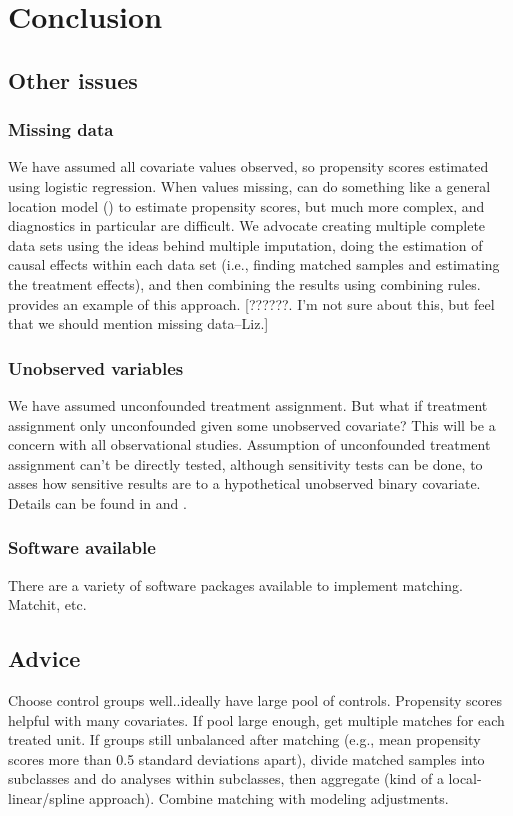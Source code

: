\documentclass[11pt,titlepage]{article}
\begin{document}
\section{Conclusion}
\subsection{Other issues}
\subsubsection{Missing data}
We have assumed all covariate values observed, so propensity scores estimated using logistic regression.  When values missing, can do something like a general
location model (\cite{DagRub00}) to estimate propensity scores, but much more complex, and diagnostics in particular are difficult.  We advocate creating 
multiple complete data sets using the ideas behind multiple imputation, doing the estimation of causal effects within each data set (i.e., finding matched samples
and estimating the treatment effects), and then combining the results using combining rules.  \cite{Song01} provides an example of this approach. 
[??????.  I'm not sure about this, but feel that we should mention
missing data--Liz.]  

\subsubsection{Unobserved variables}
We have assumed unconfounded treatment assignment.  But what if treatment assignment only unconfounded given some unobserved covariate?  This will be a concern with 
all observational studies.  Assumption of unconfounded treatment assignment can't be directly tested, although sensitivity tests can be done, to asses how sensitive
results are to a hypothetical unobserved binary covariate.  Details can be found in \cite{RosRub83b} and \cite{Imbens03}.  

\subsubsection{Software available}
There are a variety of software packages available to implement matching.  Matchit, etc.  

\subsection{Advice}
Choose control groups well..ideally have large pool of controls.  Propensity scores helpful with many covariates.  If pool large enough, get multiple matches for
each treated unit.  If groups still unbalanced after matching (e.g., mean propensity scores more than 0.5 standard deviations apart), divide matched samples into
subclasses and do analyses within subclasses, then aggregate (kind of a local-linear/spline approach).  Combine matching with modeling adjustments.  
\end{document}
